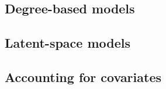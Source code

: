 \subsection{Degree-based models}

\subsection{Latent-space models}

\subsection{Accounting for covariates}
